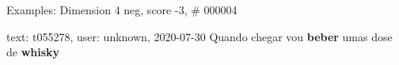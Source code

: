 \begin{frame}{Examples: Dimension 4 neg, score -3, \# 000004}
\footnotesize
\begin{alertblock}{text: t055278, user: unknown, 2020-07-30}
Quando chegar vou \textbf{beber} umas dose de \textbf{whisky} 
\textbf{}  
\end{alertblock}
\end{frame}
